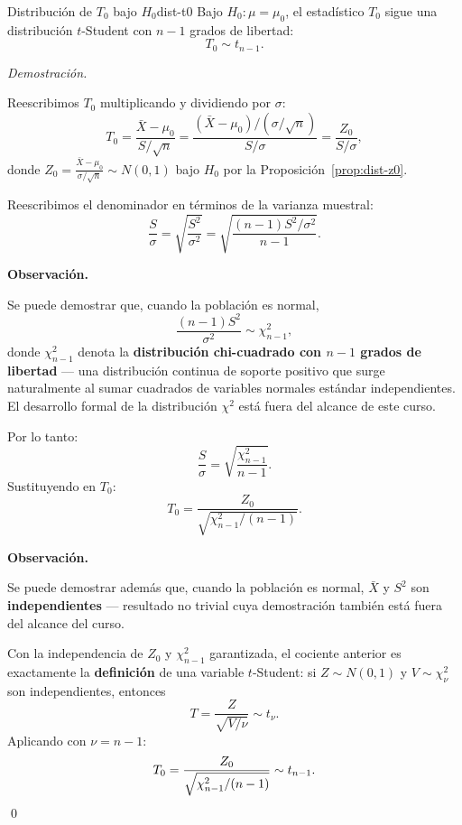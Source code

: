 \documentclass[12pt, a4paper]{book}
\newenvironment{observacion}{%
    \par\medskip\noindent\textbf{\color{azul}Observaci\'{o}n.}\enspace\itshape
}{\par\medskip}
\renewenvironment{proof}{%
    \par\medskip\noindent\textit{Demostraci\'{o}n.}\enspace
}{\qed\par\medskip}
\numberwithin{equation}{chapter}
\begin{document}
\begin{proposicion}{Distribuci\'{o}n de $T_0$
		bajo $H_0$}{dist-t0}
	Bajo $H_0: \mu = \mu_0$, el
	estad\'{i}stico $T_0$ sigue una
	distribuci\'{o}n $t$-Student con
	$n-1$ grados de libertad:
	\[
	T_0 \sim t_{n-1}.
	\]
\end{proposicion}

\begin{proof}
	Reescribimos $T_0$ multiplicando y
	dividiendo por $\sigma$:
	\[
	T_0 = \frac{\bar{X} - \mu_0}
	{S/\sqrt{n}}
	= \frac{(\bar{X} - \mu_0)/
		(\sigma/\sqrt{n})}
	{S/\sigma}
	= \frac{Z_0}{S/\sigma},
	\]
	donde $Z_0 = \frac{\bar{X} - \mu_0}
	{\sigma/\sqrt{n}} \sim N(0,1)$ bajo
	$H_0$ por la
	Proposici\'{o}n~\ref{prop:dist-z0}.
	
	\medskip
	Reescribimos el denominador en
	t\'{e}rminos de la varianza muestral:
	\[
	\frac{S}{\sigma}
	= \sqrt{\frac{S^2}{\sigma^2}}
	= \sqrt{\frac{(n-1)S^2/\sigma^2}
		{n-1}}.
	\]
	
	\begin{observacion}
		Se puede demostrar que, cuando
		la poblaci\'{o}n es normal,
		\[
		\frac{(n-1)S^2}{\sigma^2}
		\sim \chi^2_{n-1},
		\]
		donde $\chi^2_{n-1}$ denota la
		\textbf{distribuci\'{o}n
			chi-cuadrado con $n-1$ grados
			de libertad} --- una distribuci\'{o}n
		continua de soporte positivo que
		surge naturalmente al sumar
		cuadrados de variables normales
		est\'{a}ndar independientes. El
		desarrollo formal de la
		distribuci\'{o}n $\chi^2$ est\'{a}
		fuera del alcance de este curso.
	\end{observacion}
	
	Por lo tanto:
	\[
	\frac{S}{\sigma}
	= \sqrt{\frac{\chi^2_{n-1}}{n-1}}.
	\]
	Sustituyendo en $T_0$:
	\[
	T_0 = \frac{Z_0}{\sqrt{\chi^2_{n-1}
			/(n-1)}}.
	\]
	
	\begin{observacion}
		Se puede demostrar adem\'{a}s que,
		cuando la poblaci\'{o}n es normal,
		$\bar{X}$ y $S^2$ son
		\textbf{independientes} --- resultado
		no trivial cuya demostraci\'{o}n
		tambi\'{e}n est\'{a} fuera del
		alcance del curso.
	\end{observacion}
	
	Con la independencia de $Z_0$ y
	$\chi^2_{n-1}$ garantizada, el cociente
	anterior es exactamente la
	\textbf{definici\'{o}n} de una variable
	$t$-Student: si $Z \sim N(0,1)$ y
	$V \sim \chi^2_\nu$ son independientes,
	entonces
	\[
	T = \frac{Z}{\sqrt{V/\nu}}
	\sim t_\nu.
	\]
	Aplicando con $\nu = n-1$:
	\[
	T_0 = \frac{Z_0}{\sqrt{\chi^2_{n-1}
			/(n-1)}} \sim t_{n-1}. \qedhere
	\]
\end{proof}
\end{document}

